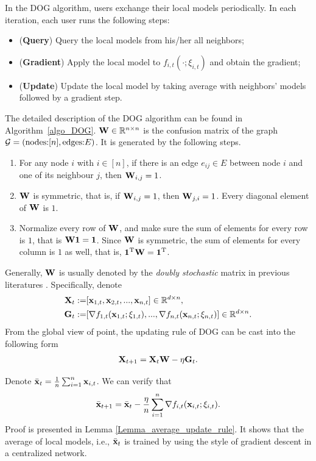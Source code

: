 \documentclass{article}
\begin{document}
In the DOG algorithm, users exchange their local models periodically. In each iteration, each user runs the following steps:
\begin{itemize}
\item ({\bf Query}) Query the local models from his/her all neighbors;
\item ({\bf Gradient}) Apply the local model to $f_{i,t}(\cdot; \xi_{i,t})$ and obtain the gradient;
\item ({\bf Update}) Update the local model by taking average with neighbors' models followed by a gradient step.
\end{itemize}
The detailed description of the DOG algorithm can be found in Algorithm~\ref{algo_DOG}.   ${\bf W}\in\mathbb{R}^{n\times n}$ is the confusion matrix of the graph ${\mathcal{G}}=(\text{nodes:} [n], \text{edges:} E)$. It is generated by the following steps.
\begin{enumerate}
\item For any node $i$ with $i\in[n]$, if there is an edge $e_{ij}\in E$ between node $i$ and one of its neighbour $j$, then ${\bf W}_{i,j} = 1$.
\item ${\bf W}$ is symmetric, that is, if ${\bf W}_{i,j} = 1$, then ${\bf W}_{j,i} = 1$. Every diagonal element of ${\bf W}$ is $1$.
\item Normalize every row of ${\bf W}$, and make sure the sum of elements for every row is $1$, that is ${\bf W}{\bf 1} = {\bf 1}$. Since ${\bf W}$ is symmetric, the sum of elements for every column is $1$ as well, that is, ${\bf 1}^{\rm T}{\bf W} = {\bf 1}^{\rm T}$.
\end{enumerate}
Generally, ${\bf W}$ is usually denoted by the \textit{doubly stochastic} matrix in previous literatures \citep{7903733,8320863,Yuan:2016ur}. Specifically, denote
\begin{align}
\nonumber
{\bf X}_t := &  [{\bf x}_{1,t}, {\bf x}_{2,t}, ..., {\bf x}_{n,t}] \in \mathbb{R}^{d\times n}, \\ \nonumber
{\bf G}_t := & [\nabla f_{1,t}({\bf x}_{1,t};\xi_{1,t}), ..., \nabla f_{n,t}({\bf x}_{n,t};\xi_{n,t})] \in \mathbb{R}^{d\times n}.
\end{align} 
From the global view of point, the updating rule of DOG can be cast into the following form
\begin{align}
\nonumber
{\bf X}_{t+1} = {\bf X}_{t}{\bf W} - \eta {\bf G}_t.
\end{align}

Denote $\bar{{\bf x}}_t = \frac{1}{n}\sum_{i=1}^n {\bf x}_{i,t}$. We can verify that 
\begin{align}
\nonumber
\bar{{\bf x}}_{t+1} =  \bar{{\bf x}}_t -  \frac{\eta}{n}\sum_{i=1}^n \nabla f_{i,t}({\bf x}_{i,t};\xi_{i,t}).
\end{align} Proof is presented in Lemma \ref{Lemma_average_update_rule}. It shows that the average of local models, i.e., $\bar{{\bf x}}_t$ is trained by using the style of gradient descent in a centralized network.  
\end{document}

